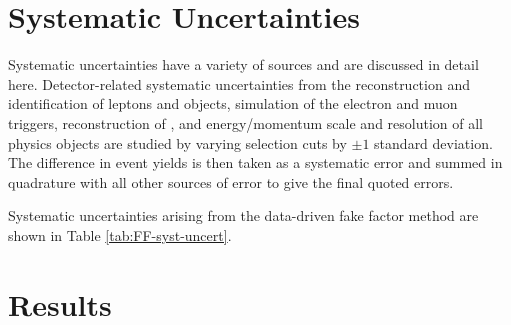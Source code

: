 	\section{Systematic Uncertainties}\label{sec:systs}
		Systematic uncertainties have a variety of sources and are discussed in detail here. Detector-related systematic uncertainties from the reconstruction and identification of leptons and \tauhad objects, simulation of the electron and muon triggers, reconstruction of \Etm, and energy/momentum scale and resolution of all physics objects are studied by varying selection cuts by $\pm 1$ standard deviation. The difference in event yields is then taken as a systematic error and summed in quadrature with all other sources of error to give the final quoted errors. 

		Systematic uncertainties arising from the data-driven fake factor method are shown in Table \ref{tab:FF-syst-uncert}.

	\begin{table}[!htb]
	  \begin{center}
	  \end{center}
	  \caption{\label{tab:FF-syst-uncert}
	    Effect on the shape variation and the yields of systematic uncertainties associated with the data-driven fake
	    factor method, used to estimate the $j \rightarrow \tau$ background in the
	   \taujets and \taulep channel.
	    }
	\end{table}

	\section{Results}\label{sec:results}

